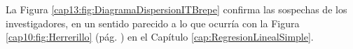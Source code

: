 \begin{ejemplo}
\begin{itemize}



\end{itemize}

%

La Figura \ref{cap13:fig:DiagramaDispersionITBrepe} confirma las sospechas de los investigadores, en un sentido parecido a lo que ocurría con la Figura \ref{cap10:fig:Herrerillo} (pág. \pageref{cap10:fig:Herrerillo}) en el Capítulo \ref{cap:RegresionLinealSimple}.


\end{ejemplo}
